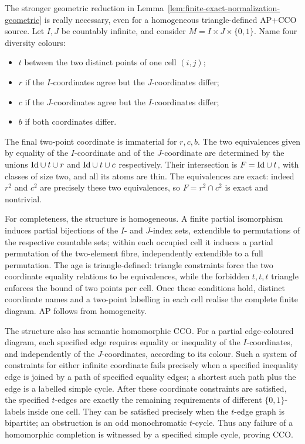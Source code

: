 \begin{example}
\label{ex:thin-not-exact-free}
The stronger geometric reduction in Lemma~\ref{lem:finite-exact-normalization-geometric} is really
necessary, even for a homogeneous triangle-defined AP+CCO source.
Let $I,J$ be countably infinite, and consider
$M=I\times J\times\{0,1\}$.  Name four diversity colours:
\begin{itemize}
\item $t$ between the two distinct points of one cell $(i,j)$;
\item $r$ if the $I$-coordinates agree but the $J$-coordinates differ;
\item $c$ if the $J$-coordinates agree but the $I$-coordinates differ;
\item $b$ if both coordinates differ.
\end{itemize}
The final two-point coordinate is immaterial for $r,c,b$.
The two equivalences given by equality of the $I$-coordinate and
of the $J$-coordinate are determined by the unions
$\mathrm{Id}\cup t\cup r$ and $\mathrm{Id}\cup t\cup c$ respectively.  Their
intersection is $F=\mathrm{Id}\cup t$, with classes of size two, and all
its atoms are thin.  The equivalences are exact: indeed $r^2$
and $c^2$ are precisely these two equivalences, so
$F=r^2\cap c^2$ is exact and nontrivial.

For completeness, the structure is homogeneous.  A finite partial
isomorphism induces partial bijections of the $I$- and $J$-index
sets, extendible to permutations of the respective countable sets;
within each occupied cell it induces a partial permutation of the
two-element fibre, independently extendible to a full permutation.
The age is triangle-defined: triangle constraints force the two
coordinate equality relations to be equivalences, while the forbidden
$t,t,t$ triangle enforces the bound of two points per cell.  Once
these conditions hold, distinct coordinate names and a two-point
labelling in each cell realise the complete finite diagram.  AP
follows from homogeneity.

The structure also has semantic homomorphic CCO.  For a partial
edge-coloured diagram, each specified edge requires equality or
inequality of the $I$-coordinates, and independently of the
$J$-coordinates, according to its colour.  Such a system of
constraints for either infinite coordinate fails precisely when a
specified inequality edge is joined by a path of specified equality
edges; a shortest such path plus the edge is a labelled simple cycle.
After these coordinate constraints are satisfied, the specified
$t$-edges are exactly the remaining requirements of different
$\{0,1\}$-labels inside one cell.  They can be satisfied precisely
when the $t$-edge graph is bipartite; an obstruction is an odd
monochromatic $t$-cycle.  Thus any failure of a homomorphic
completion is witnessed by a specified simple cycle, proving CCO.


\end{example}
